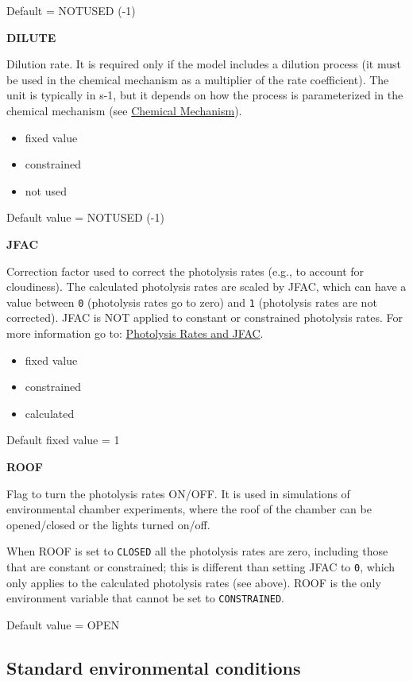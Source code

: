 Default = NOTUSED (-1)

\textbf{DILUTE}

Dilution rate. It is required only if the model includes a dilution
process (it must be used in the chemical mechanism as a multiplier of
the rate coefficient). The unit is typically in s-1, but it depends on
how the process is parameterized in the chemical mechanism (see
\hyperref[sec:mechanism]{Chemical Mechanism}).

\begin{itemize}
\item fixed value
\item constrained
\item not used
\end{itemize}

Default value = NOTUSED (-1)

\textbf{JFAC}

Correction factor used to correct the photolysis rates (e.g., to
account for cloudiness). The calculated photolysis rates are scaled by
JFAC, which can have a value between \texttt{0} (photolysis rates go
to zero) and \texttt{1} (photolysis rates are not corrected). JFAC is
NOT applied to constant or constrained photolysis rates. For more
information go to: \hyperref[sec:photolysis]{Photolysis Rates and
  JFAC}.

\begin{itemize}
\item fixed value
\item constrained
\item calculated
\end{itemize}

Default fixed value = 1

\textbf{ROOF}

Flag to turn the photolysis rates ON/OFF. It is used in simulations of
environmental chamber experiments, where the roof of the chamber can
be opened/closed or the lights turned on/off.

When ROOF is set to \texttt{CLOSED} all the photolysis rates are zero,
including those that are constant or constrained; this is different
than setting JFAC to \texttt{0}, which only applies to the calculated
photolysis rates (see above). ROOF is the only environment variable
that cannot be set to \texttt{CONSTRAINED}.

Default value = OPEN

\subsection{Standard environmental
  conditions} \label{subsec:standard-environmental-conditions}

